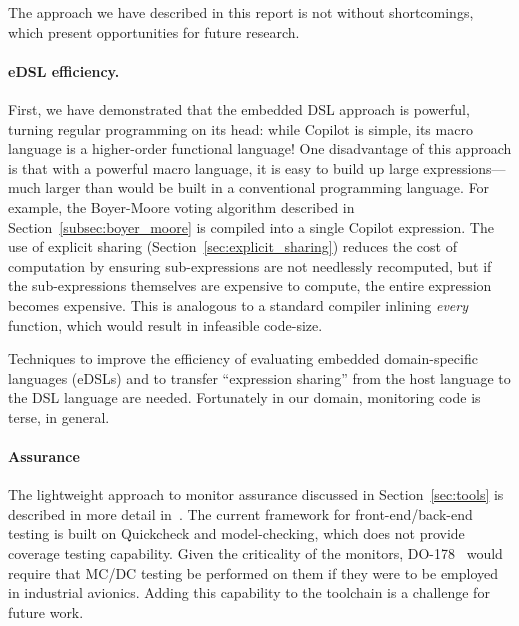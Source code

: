 The approach we have described in this report is not without shortcomings, which
present opportunities for future research.

\paragraph{eDSL efficiency.}
First, we have demonstrated that the embedded DSL approach is powerful,
turning regular programming on its head: while Copilot is simple, its
macro language is a higher-order functional language!  One disadvantage of this
approach is that with a powerful macro language, it is easy to
build up large expressions---much larger than would be built in a
conventional programming language.  For example, the Boyer-Moore
voting algorithm described in Section~\ref{subsec:boyer_moore} is compiled into
a single Copilot expression.  The use of explicit sharing
(Section~\ref{sec:explicit_sharing}) reduces the cost of computation by ensuring
sub-expressions are not needlessly recomputed, but if the sub-expressions
themselves are expensive to compute, the entire expression becomes expensive.
This is analogous to a standard compiler inlining \emph{every} function, which
would result in infeasible code-size.  

Techniques to improve the efficiency of evaluating embedded domain-specific
languages (eDSLs) and to transfer ``expression sharing''
from the host language to the DSL language are needed.  Fortunately in our
domain, monitoring code is terse, in general.

\paragraph{Assurance}
The lightweight approach to monitor assurance discussed in
Section~\ref{sec:tools} is described in more detail
in~\cite{PikeWNG2012}.  The current framework for front-end/back-end
testing is built on Quickcheck and model-checking, which does not provide coverage
testing capability.  Given the criticality of the monitors,
DO-178~\cite{DO178B} would require that MC/DC testing be performed on
them if they were to be employed in industrial avionics. Adding this
capability to the toolchain is a challenge for future work.


